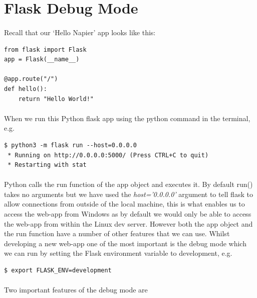 \documentclass[12pt, a4paper, oneside]{book}
\begin{document}
\section{Flask Debug Mode}
\label{debug}
\paragraph{} Recall that our `Hello Napier' app looks like this:

\begin{lstlisting}
from flask import Flask
app = Flask(__name__)

@app.route("/")
def hello():
    return "Hello World!"
\end{lstlisting}

\paragraph{} When we run this Python flask app using the python command in the terminal, e.g.

\begin{lstlisting}[style=DOS]
$ python3 -m flask run --host=0.0.0.0 
 * Running on http://0.0.0.0:5000/ (Press CTRL+C to quit)
 * Restarting with stat
\end{lstlisting}

\paragraph{} Python calls the run function of the app object and executes it. By default run() takes no arguments but we have used the \emph{host='0.0.0.0'} argument to tell flask to allow connections from outside of the local machine, this is what enables us to access the web-app from Windows as by default we would only be able to access the web-app from within the Linux dev server. However both the app object and the run function have a number of other features that we can use. Whilst developing a new web-app one of the most important is the debug mode which we can run by setting the Flask environment variable to development, e.g.

\begin{lstlisting}[style=DOS]
    $ export FLASK_ENV=development
\end{lstlisting}

\paragraph{} Two important features of the debug mode are
\end{document}

